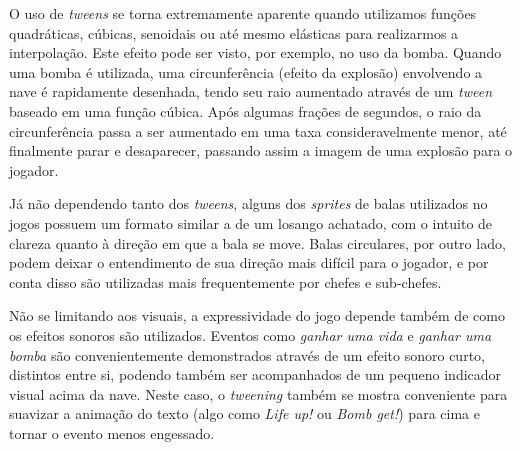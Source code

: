 O uso de \textit{tweens} se torna extremamente aparente quando utilizamos funções quadráticas, cúbicas, senoidais ou até mesmo elásticas para realizarmos a interpolação. Este efeito pode ser visto, por exemplo, no uso da bomba. Quando uma bomba é utilizada, uma circunferência (efeito da explosão) envolvendo a nave é rapidamente desenhada, tendo seu raio aumentado através de um \textit{tween} baseado em uma função cúbica. Após algumas frações de segundos, o raio da circunferência passa a ser aumentado em uma taxa consideravelmente menor, até finalmente parar e desaparecer, passando assim a imagem de uma explosão para o jogador.

Já não dependendo tanto dos \textit{tweens}, alguns dos \textit{sprites} de balas utilizados no jogos possuem um formato similar a de um losango achatado, com o intuito de clareza quanto à direção em que a bala se move. Balas circulares, por outro lado, podem deixar o entendimento de sua direção mais difícil para o jogador, e por conta disso são utilizadas mais frequentemente por chefes e sub-chefes.

Não se limitando aos visuais, a expressividade do jogo depende também de como os efeitos sonoros são utilizados. Eventos como \textit{ganhar uma vida} e \textit{ganhar uma bomba} são convenientemente demonstrados através de um efeito sonoro curto, distintos entre si, podendo também ser acompanhados de um pequeno indicador visual acima da nave. Neste caso, o \textit{tweening} também se mostra conveniente para suavizar a animação do texto (algo como \textit{Life up!} ou \textit{Bomb get!}) para cima e tornar o evento menos engessado.


